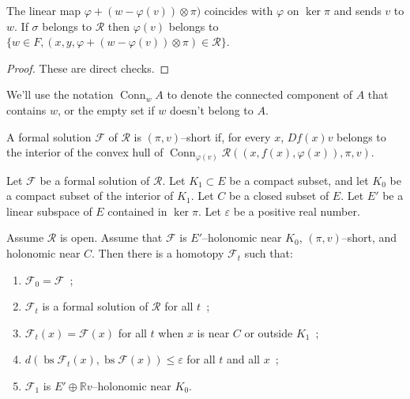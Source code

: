 \documentclass[10pt,a4paper]{article}
\newcommand{\Rel}{\mathcal{R}} %
\DeclareMathOperator{\Conn}{Conn} %
\newcommand{\F}{\mathcal{F}} %
\DeclareMathOperator{\bs}{bs} %
\newcommand{\uses}[1]{}
\newcommand{\lean}[1]{}
\newcommand{\leanok}{}
\begin{document}
\begin{lemma}
  \label{lem:update_lin_map}
  \leanok
  \lean{DualPair.update_ker_pi, DualPair.update_v, mem_slice}
  The linear map $φ + (w - φ(v)) ⊗ π)$ coincides with $φ$ on $\ker π$
  and sends $v$ to $w$.
  If $\sigma$ belongs to $\Rel$ then $φ(v)$ belongs to
  $\{w ∈ F, (x, y, φ + (w - φ(v)) ⊗ π) ∈ \Rel\}$.
\end{lemma}

\begin{proof}\leanok
  These are direct checks.
\end{proof}


We'll use the notation $\Conn_w A$ to denote the connected component of $A$
that contains $w$, or the empty set if $w$ doesn't belong to $A$.

\begin{definition}
  \label{def:short_formal_sol}
  \leanok
  \lean{RelLoc.FormalSol.IsShortAt}
  \uses{def:formal_sol_loc, def:dual_pair}
  A formal solution $\F$ of $\Rel$ is $(π, v)$--short if,
  for every $x$, $Df(x)v$ belongs to the interior of the convex hull of
  $\Conn_{φ(v)}\Rel((x, f(x), φ(x)), π, v)$.
\end{definition}

\begin{lemma}
  \label{lem:integration_step}
  \leanok
  \lean{StepLandscape.improveStep_rel_t_eq_0, StepLandscape.improveStep_rel_C,%
  StepLandscape.improveStep_rel_compl_K₁, StepLandscape.improveStep_c0_close,%
  StepLandscape.improveStep_part_hol}
  \uses{def:short_formal_sol, def:hol_partial, def:htpy_jet_sec_loc}
  Let $\F$ be a formal solution of $\Rel$.
  Let $K_1 ⊂ E$ be a compact subset, and let $K_0$ be a compact subset of
  the interior of $K_1$. Let $C$ be a closed subset of $E$.
  Let $E'$ be a linear subspace of $E$ contained in $\ker π$.
  Let $ε$ be a positive real number.

  Assume $\Rel$ is open.
  Assume that $\F$ is $E'$--holonomic near $K_0$, $(π, v)$--short,
  and holonomic near $C$.
  Then there is a homotopy $\F_t$ such that:
  \begin{enumerate}
    \item
      $\F_0 = \F$~;
    \item
      $\F_t$ is a formal solution of $\Rel$ for all $t$~;
    \item
      $\F_t(x) = \F(x)$ for all $t$ when $x$ is near $C$ or outside
      $K_1$~;
    \item
      $d(\bs\F_t(x), \bs \F(x)) ≤ ε$ for all $t$ and all $x$~;
    \item
      $\F_1$ is $E' ⊕ ℝv$--holonomic near $K_0$.
  \end{enumerate}
\end{lemma}
\end{document}
